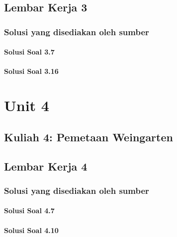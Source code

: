 \documentclass[11pt,a4paper,oneside]{book}
\begin{document}
\chapter{Lembar Kerja 3}


\section*{Solusi yang disediakan oleh sumber}
\subsection*{Solusi Soal 3.7}

\subsection*{Solusi Soal 3.16}


\part{Unit 4}
\chapter[Kuliah 4]{Kuliah 4: Pemetaan Weingarten}


\chapter{Lembar Kerja 4}


\section*{Solusi yang disediakan oleh sumber}
\subsection*{Solusi Soal 4.7}

\subsection*{Solusi Soal 4.10}

\end{document}
